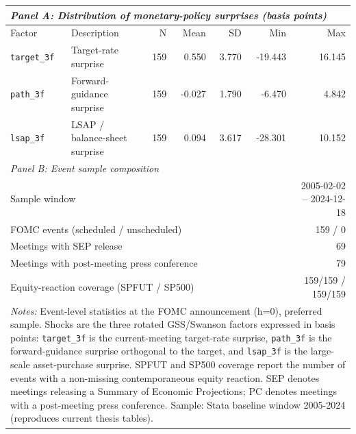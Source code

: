 \begin{tabular}{l l r r r r r}
\toprule
\multicolumn{7}{l}{\textit{Panel A: Distribution of monetary-policy surprises (basis points)}} \\
\midrule
Factor & Description & N & Mean & SD & Min & Max \\
\midrule
\texttt{target\_3f} & Target-rate surprise & 159 & 0.550 & 3.770 & -19.443 & 16.145 \\
\texttt{path\_3f} & Forward-guidance surprise & 159 & -0.027 & 1.790 & -6.470 & 4.842 \\
\texttt{lsap\_3f} & LSAP / balance-sheet surprise & 159 & 0.094 & 3.617 & -28.301 & 10.152 \\
\midrule
\multicolumn{7}{l}{\textit{Panel B: Event sample composition}} \\
\midrule
\multicolumn{6}{l}{Sample window} & 2005-02-02 -- 2024-12-18 \\
\multicolumn{6}{l}{FOMC events (scheduled / unscheduled)} & 159 / 0 \\
\multicolumn{6}{l}{Meetings with SEP release} & 69 \\
\multicolumn{6}{l}{Meetings with post-meeting press conference} & 79 \\
\multicolumn{6}{l}{Equity-reaction coverage (SPFUT / SP500)} & 159/159 / 159/159 \\
\bottomrule
\multicolumn{7}{p{\linewidth}}{\footnotesize \textit{Notes:} Event-level statistics at the FOMC announcement (h=0), preferred sample. Shocks are the three rotated GSS/Swanson factors \citep{gurkaynakSackSwanson2005,swanson2021} expressed in basis points: \texttt{target\_3f} is the current-meeting target-rate surprise, \texttt{path\_3f} is the forward-guidance surprise orthogonal to the target, and \texttt{lsap\_3f} is the large-scale asset-purchase surprise. SPFUT and SP500 coverage report the number of events with a non-missing contemporaneous equity reaction. SEP denotes meetings releasing a Summary of Economic Projections; PC denotes meetings with a post-meeting press conference. Sample: Stata baseline window 2005-2024 (reproduces current thesis tables).} \\
\end{tabular}
